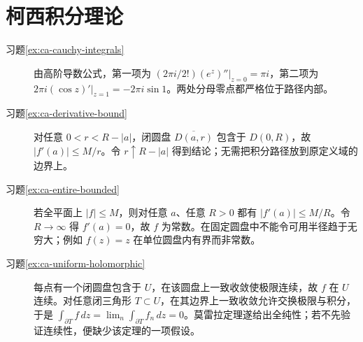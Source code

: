 \documentclass[UTF8,12pt,a4paper,fontset=fandol]{ctexbook}
\begin{document}
\section{柯西积分理论}
\begin{description}
 \item[习题\ref{ex:ca-cauchy-integrals}]
 由高阶导数公式，第一项为 $(2\pi i/2!)(e^z)''|_{z=0}=\pi i$，第二项为 $2\pi i(\cos z)'|_{z=1}=-2\pi i\sin1$。两处分母零点都严格位于路径内部。
 \item[习题\ref{ex:ca-derivative-bound}]
 对任意 $0<r<R-|a|$，闭圆盘 $\overline{D(a,r)}$ 包含于 $D(0,R)$，故 $|f'(a)|\le M/r$。令 $r\uparrow R-|a|$ 得到结论；无需把积分路径放到原定义域的边界上。
 \item[习题\ref{ex:ca-entire-bounded}]
 若全平面上 $|f|\le M$，则对任意 $a$、任意 $R>0$ 都有 $|f'(a)|\le M/R$。令 $R\to\infty$ 得 $f'(a)=0$，故 $f$ 为常数。在固定圆盘中不能令可用半径趋于无穷大；例如 $f(z)=z$ 在单位圆盘内有界而非常数。
 \item[习题\ref{ex:ca-uniform-holomorphic}]
 每点有一个闭圆盘包含于 $U$，在该圆盘上一致收敛使极限连续，故 $f$ 在 $U$ 连续。对任意闭三角形 $T\subset U$，在其边界上一致收敛允许交换极限与积分，于是 $\int_{\partial T}f\,dz=\lim_n\int_{\partial T}f_n\,dz=0$。莫雷拉定理遂给出全纯性；若不先验证连续性，便缺少该定理的一项假设。
\end{description}
\end{document}
